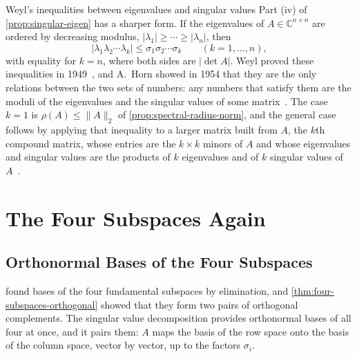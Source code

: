\begin{note}{Weyl's inequalities between eigenvalues and singular values}
Part (iv) of \cref{prop:singular-eigen} has a sharper form. If the eigenvalues of $A\in\mathbb C^{n\times n}$ are ordered by decreasing modulus, $|\lambda_1|\ge\cdots\ge|\lambda_n|$, then
\[
|\lambda_1\lambda_2\cdots\lambda_k|\le\sigma_1\sigma_2\cdots\sigma_k\qquad(k=1,\ldots,n),
\]
with equality for $k=n$, where both sides are $|\det A|$. Weyl proved these inequalities in 1949~\cite{weyl1949}, and A.~Horn showed in 1954 that they are the only relations between the two sets of numbers: any numbers that satisfy them are the moduli of the eigenvalues and the singular values of some matrix~\cite{horn1954}. The case $k=1$ is $\rho(A)\le\|A\|_2$ of \cref{prop:spectral-radius-norm}, and the general case follows by applying that inequality to a larger matrix built from $A$, the $k$th compound matrix, whose entries are the $k\times k$ minors of $A$ and whose eigenvalues and singular values are the products of $k$ eigenvalues and of $k$ singular values of $A$~\cite[Chap.~3]{horn1991topics}.
\end{note}

\section{The Four Subspaces Again}
\label{sec:svd-subspaces}

\subsection{Orthonormal Bases of the Four Subspaces}

 found bases of the four fundamental subspaces by elimination, and \cref{thm:four-subspaces-orthogonal} showed that they form two pairs of orthogonal complements. The singular value decomposition provides orthonormal bases of all four at once, and it pairs them: $A$ maps the basis of the row space onto the basis of the column space, vector by vector, up to the factors $\sigma_i$.

